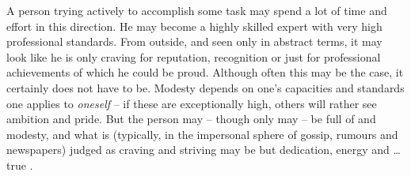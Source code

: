 A person trying actively to accomplish some task may spend a lot of time and
effort in this direction.  He may become a highly skilled expert with very high
professional standards.  From outside, and seen only in abstract terms, it may
look like he is only craving for reputation, recognition or just for
professional achievements of which he could be proud. Although often this may be
the case, it certainly does not have to be.
Modesty depends on one's capacities and standards one applies to
{\em oneself} -- if these are exceptionally high, others will rather see
ambition and pride.  But the person may -- though
only may -- be full of  and modesty, and what is (typically, in the
impersonal sphere of gossip, rumours and newspapers) judged as
craving and striving may be but dedication, energy and \ldots true .

